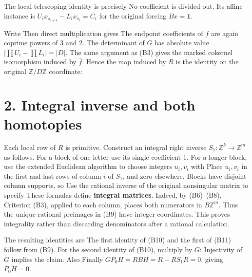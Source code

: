 The local telescoping identity is precisely 
No coefficient is divided out. Its affine instance is
\(U_i x_{s_{i+1}}-L_i x_{s_i}=C_i\) for the original forcing
\(Bx=\mathbf1\).

Write
Then direct multiplication gives
 The endpoint
coefficients of \(\bar f\) are again coprime powers of 3 and 2. The
determinant of \(G\) has absolute value \(|\prod U_i-\prod L_i|=|D|\).
The same argument as (B3) gives the marked cokernel isomorphism induced
by \(\bar f\). Hence the map induced by \(R\) is the identity on the
original \(\mathbb Z/D\mathbb Z\) coordinate:

\section{2. Integral inverse and both homotopies}

Each local row of \(R\) is primitive. Construct an integral right
inverse \(S_1:\mathbb Z^k\to\mathbb Z^m\) as follows. For a block of one
letter use its single coefficient 1. For a longer block, use the
extended Euclidean algorithm to choose integers \(u_i,v_i\) with
 Place
\(u_i,v_i\) in the first and last rows of column \(i\) of \(S_1\), and
zero elsewhere. Blocks have disjoint column supports, so
 Use the rational inverse of the original
nonsingular matrix to specify
 These
formulas define \textbf{integral matrices}. Indeed, by (B6)--(B8),
 Criterion
(B3), applied to each column, places both numerators in
\(B\mathbb Z^m\). Thus the unique rational preimages in (B9) have
integer coordinates. This proves integrality rather than discarding
denominators after a rational calculation.

The resulting identities are
 The
first identity of (B10) and the first of (B11) follow from (B9). For the
second identity of (B10), multiply by \(G\):
 Injectivity of \(G\) implies the
claim. Also  Finally
\(GP_0H=RBH=R-RS_1R=0\), giving \(P_0H=0\).

